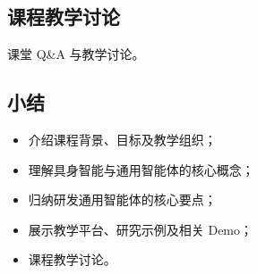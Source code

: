 \subsection{课程教学讨论}

课堂 Q\&A 与教学讨论。

\subsection{小结}

\begin{itemize}[itemsep=2pt]
    \item 介绍课程背景、目标及教学组织；
    \item 理解具身智能与通用智能体的核心概念；
    \item 归纳研发通用智能体的核心要点；
    \item 展示教学平台、研究示例及相关 Demo；
    \item 课程教学讨论。
\end{itemize}

